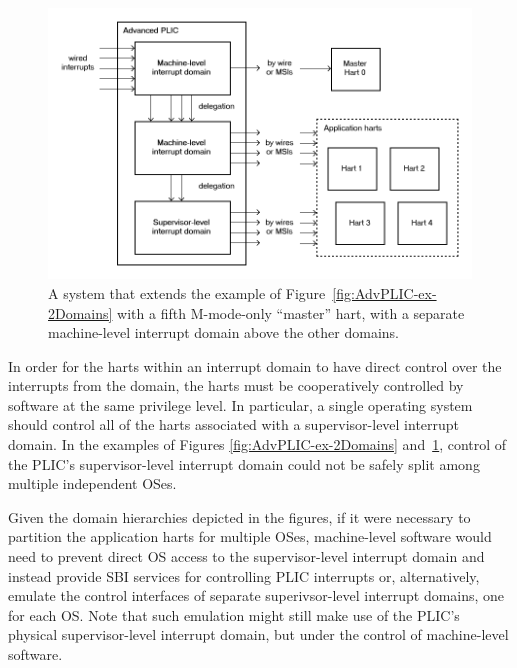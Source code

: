 \begin{figure}[th]
\centerline{\includegraphics[scale=0.55]{AdvPLIC-ex-3Domains.png}}
\caption{%
A {\RISCV} system that extends the example of
Figure~\ref{fig:AdvPLIC-ex-2Domains} with a fifth \mbox{M-mode}-only
``master'' hart, with a separate machine-level interrupt domain above
the other domains.%
}
\label{fig:AdvPLIC-ex-3Domains}
\end{figure}

\FloatBarrier

\begin{commentary}
In order for the harts within an interrupt domain to have direct
control over the interrupts from the domain, the harts must be
cooperatively controlled by software at the same privilege level.
In particular, a single operating system should control all of the
harts associated with a supervisor-level interrupt domain.
In the examples of Figures \ref{fig:AdvPLIC-ex-2Domains}
and~\ref{fig:AdvPLIC-ex-3Domains}, control of the PLIC's
supervisor-level interrupt domain could not be safely split among
multiple independent OSes.

Given the domain hierarchies depicted in the figures, if it were
necessary to partition the application harts for multiple OSes,
machine-level software would need to prevent direct OS access to the
supervisor-level interrupt domain and instead provide SBI services
for controlling PLIC interrupts or, alternatively, emulate the control
interfaces of separate superivsor-level interrupt domains, one for each
OS.
Note that such emulation might still make use of the PLIC's
physical supervisor-level interrupt domain, but under the control of
machine-level software.
\end{commentary}

